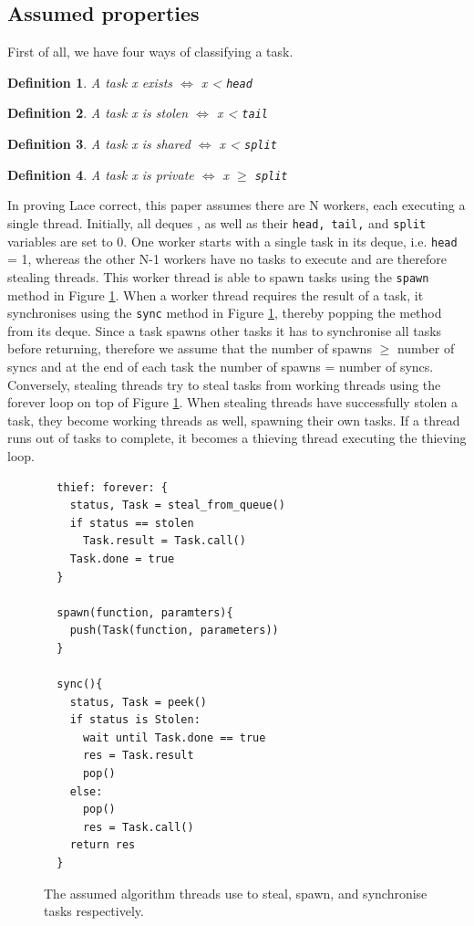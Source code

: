 \documentclass{sig-alternate-br}
\newtheorem{definition}{Definition}
\begin{document}
\subsection{Assumed properties}
First of all, we have four ways of classifying a task.
\begin{definition}A task x exists $\iff$ x < \texttt{head}\end{definition}
\begin{definition}A task x is stolen $\iff$ x < \texttt{tail}\end{definition}
\begin{definition}A task x is shared $\iff$ x < \texttt{split}\end{definition}
\begin{definition}A task x is private $\iff$ x $\geq$ \texttt{split}\end{definition}
In proving Lace correct, this paper assumes there are N workers, each executing a single thread.
Initially, all deques , as well as their \texttt{head, tail,} and \texttt{split} variables are set to 0.
One worker starts with a single task in its deque, i.e. \texttt{head} = 1, whereas the other N-1 workers have no tasks to execute and are therefore stealing threads.
This worker thread is able to spawn tasks using the \texttt{spawn} method in Figure \ref{fig:assumption.code}.
When a worker thread requires the result of a task, it synchronises using the \texttt{sync} method in Figure \ref{fig:assumption.code}, thereby popping the method from its deque.
Since a task spawns other tasks it has to synchronise all tasks before returning, therefore we assume that the number of spawns $\geq$ number of syncs and at the end of each task the number of spawns = number of syncs.
Conversely, stealing threads try to steal tasks from working threads using the forever loop on top of Figure \ref{fig:assumption.code}.
When stealing threads have successfully stolen a task, they become working threads as well, spawning their own tasks.
If a thread runs out of tasks to complete, it becomes a thieving thread executing the thieving loop.
\begin{figure}[h]
\begin{lstlisting}
  thief: forever: {
    status, Task = steal_from_queue()
    if status == stolen
      Task.result = Task.call()
    Task.done = true
  }

  spawn(function, paramters){
    push(Task(function, parameters))
  }

  sync(){
    status, Task = peek()
    if status is Stolen:
      wait until Task.done == true
      res = Task.result
      pop()
    else:
      pop()
      res = Task.call()
    return res
  }
\end{lstlisting}
\caption{The assumed algorithm threads use to steal, spawn, and synchronise tasks respectively.}
\label{fig:assumption.code}
\end{figure}
\end{document}
